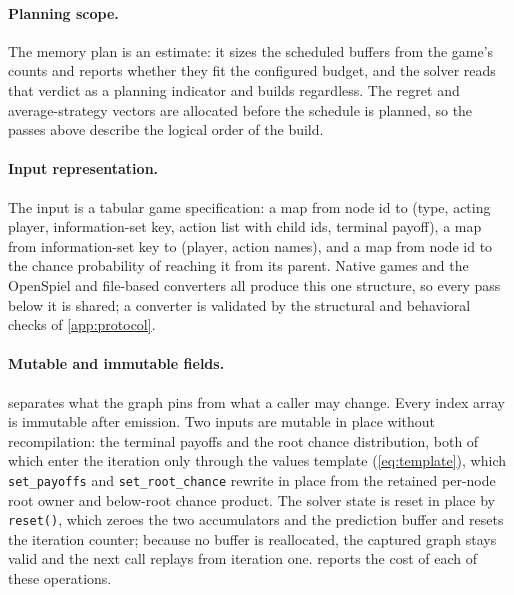 

\paragraph{Planning scope.}
The memory plan is an estimate: it sizes the scheduled buffers from the
game's counts and reports whether they fit the configured budget, and the
solver reads that verdict as a planning indicator and builds regardless. The regret and average-strategy vectors are allocated before the
schedule is planned, so the passes above describe the logical order of the
build.

\paragraph{Input representation.}
The input is a tabular game specification: a map from node id to (type, acting
player, information-set key, action list with child ids, terminal payoff), a map
from information-set key to (player, action names), and a map from node id to the
chance probability of reaching it from its parent. Native games and the
OpenSpiel and file-based converters all produce this one structure, so every
pass below it is shared; a converter is validated by the structural and
behavioral checks of \cref{app:protocol}.

\paragraph{Mutable and immutable fields.}
 separates what the graph pins from what a caller may change.
Every index array is immutable after emission. Two inputs are mutable in place
without recompilation: the terminal payoffs and the root chance distribution,
both of which enter the iteration only through the values template
(\cref{eq:template}), which \texttt{set\_payoffs} and \texttt{set\_root\_chance}
rewrite in place from the retained per-node root owner and below-root chance
product. The solver state is reset in place by \texttt{reset()}, which zeroes
the two accumulators and the prediction buffer and resets the iteration counter;
because no buffer is reallocated, the captured graph stays valid and the next
call replays from iteration one.  reports the cost of each
of these operations.

